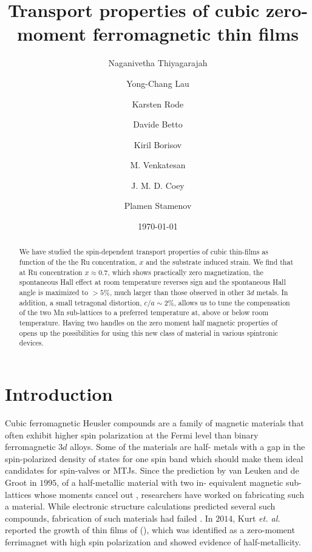 \documentclass[reprint,aip,apl,floatfix,linenumbers,superscriptaddress]{revtex4-1}
\begin{document}
\title{Transport properties of cubic zero-moment ferromagnetic  thin films}
\author{Naganivetha Thiyagarajah}
\author{Yong-Chang Lau}
\author{Karsten Rode}
\author{Davide Betto}
\author{Kiril Borisov}
\author{M. Venkatesan}
\author{J. M. D. Coey}
\author{Plamen Stamenov}

\date{\today}

\begin{abstract}
We have studied the spin-dependent transport properties of cubic  thin-films as function of the the Ru concentration, $x$ and the substrate 
induced strain. We find that at Ru concentration $x\approx\num{0.7}$, which 
shows practically zero magnetization, the spontaneous Hall effect at room 
temperature reverses sign and the spontaneous Hall angle is maximized to $>5\%
$, much larger than those observed in other $3d$ metals. In addition, a small 
tetragonal distortion, $c/a\sim\num{2}\%$, allows us to tune the compensation 
of the two Mn sub-lattices to a preferred temperature at, above or below room 
temperature. Having two handles on the zero moment half magnetic properties 
of  opens up the possibilities for using this new class of 
material in various spintronic devices. 


\end{abstract}
\maketitle

\section{Introduction}
\label{sec:intro}

Cubic ferromagnetic Heusler compounds are a family of magnetic materials that 
often exhibit higher spin polarization at the Fermi level than binary 
ferromagnetic $3d$ alloys\cite{Graf2013}. Some of the materials are half-
metals with a gap in the spin-polarized density of states for one spin band 
which should make them ideal candidates for spin-valves or MTJs\cite{PhysRevB.28.1745,Wang2009,Takahashi2011,Tsunegi2008}.  Since the prediction by van 
Leuken and de Groot in $1995$, of a half-metallic material with two in-
equivalent magnetic sub-lattices whose moments cancel out \cite{PhysRevLett.50.2024}, researchers have worked on fabricating such a material. While 
electronic structure calculations predicted several such compounds\cite{
Wurmehl2006, Hu2012, Galanakis2006}, fabrication of such materials had failed
\cite{Hu2012,PhysRevB.79.100406}. In $2014$, Kurt \textit{et. al.} reported 
the growth of thin films of  (), which was identified 
as a zero-moment ferrimagnet with high spin polarization and showed evidence 
of half-metallicity\cite{KurtPRL2014}. 
\end{document}
